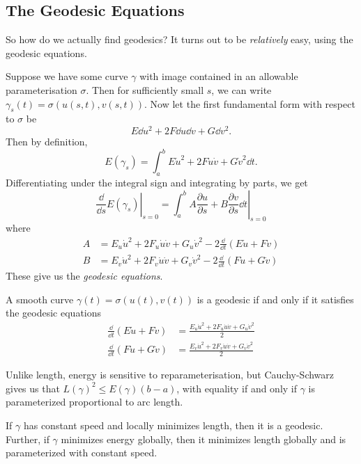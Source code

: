 \documentclass[a4paper, 10pt, twocolumn]{amsart}
\begin{document}
\subsection{The Geodesic Equations}

So how do we actually find geodesics? It turns out to be \emph{relatively} easy, using the geodesic equations.

Suppose we have some curve $\gamma$ with image contained in an allowable parameterisation $\sigma$. Then for sufficiently small $s$, we can write $\gamma_s(t) = \sigma(u(s, t), v(s, t))$. 
Now let the first fundamental form with respect to $\sigma$ be
$$
E \dd u ^2 + 2F \dd u \dd v + G \dd v^2.
$$
Then by definition,
$$
E(\gamma_s) = \int_a^b E \dot{u}^2 + 2F \dot{u} \dot{v} + G \dot{v}^2 \dd t.
$$
Differentiating under the integral sign and integrating by parts, we get
$$
\left.\frac{\dd}{\dd s} E(\gamma_s) \right|_{s = 0} = \left.\int_a^b A \frac{\partial u}{\partial s} + B \frac{\partial v}{\partial s} \dd t \right|_{s = 0}
$$
where
\begin{align*}
    A &= E_u \dot{u}^2 + 2F_u \dot{u} \dot{v} + G_u \dot{v}^2 - 2 \frac{\dd}{\dd t} (E \dot{u} + F \dot{v}) \\
    B &= E_v \dot{u}^2 + 2F_v \dot{u} \dot{v} + G_v \dot{v}^2 - 2 \frac{\dd}{\dd t}(F \dot{u} + G\dot{v})
\end{align*}
These give us the \emph{geodesic equations}.

\begin{theorem}
    A smooth curve $\gamma(t) = \sigma(u(t), v(t))$ is a geodesic if and only if it satisfies the geodesic equations
    \begin{align*}
        \frac{\dd}{\dd t} (E \dot{u} + F \dot{v}) &= \frac{
        E_u \dot{u}^2 + 2F_u \dot{u} \dot{v} + G_u \dot{v}^2}{2} \\
        \frac{\dd}{\dd t}(F \dot{u} + G\dot{v})  &= \frac{E_v \dot{u}^2 + 2F_v \dot{u} \dot{v} + G_v \dot{v}^2}{2}
    \end{align*}
\end{theorem}

Unlike length, energy is sensitive to reparameterisation, but Cauchy-Schwarz gives us that $L(\gamma)^2 \leq E(\gamma) (b - a)$, with equality if and only if $\gamma$ is parameterized proportional to arc length.

\begin{corollary}
    If $\gamma$ has constant speed and locally minimizes length, then it is a geodesic. Further, if $\gamma$ minimizes energy globally, then it minimizes length globally and is parameterized with constant speed.
\end{corollary}
\end{document}
